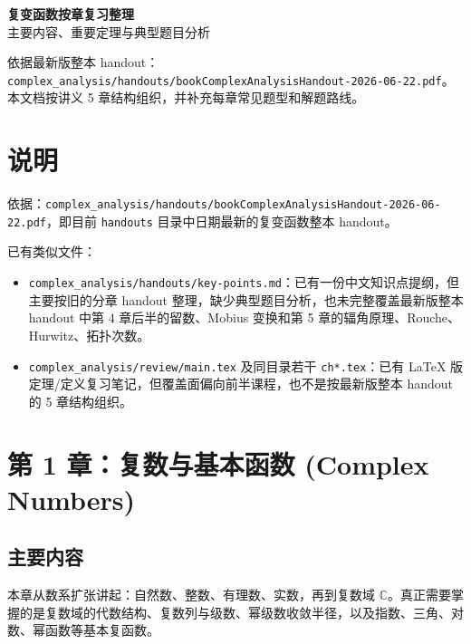 \documentclass{article}
\newcommand{\C}{\mathbb{C}}
\newcommand{\sourceHandout}{\texttt{complex\_analysis/handouts/bookComplexAnalysisHandout-2026-06-22.pdf}}
\newcommand{\keyFile}[1]{\texttt{#1}}
\begin{document}
\pagestyle{fancy}
\fancyhead{}
\rhead{\today}

\begin{center}
  {\Large\bfseries 复变函数按章复习整理}\\[6pt]
  {\large 主要内容、重要定理与典型题目分析}
\end{center}
\vspace{6pt}

\noindent
依据最新版整本 handout：\sourceHandout。
本文档按讲义 5 章结构组织，并补充每章常见题型和解题路线。

\tableofcontents
\newpage

\section*{说明}

依据：\sourceHandout，即目前 \keyFile{handouts} 目录中日期最新的复变函数整本 handout。

已有类似文件：

\begin{itemize}
\item
  \texttt{complex\_analysis/handouts/key-points.md}：已有一份中文知识点提纲，但主要按旧的分章
  handout 整理，缺少典型题目分析，也未完整覆盖最新版整本 handout 中第 4
  章后半的留数、Mobius 变换和第 5
  章的辐角原理、Rouche、Hurwitz、拓扑次数。
\item
  \texttt{complex\_analysis/review/main.tex} 及同目录若干
  \texttt{ch*.tex}：已有 LaTeX
  版定理/定义复习笔记，但覆盖面偏向前半课程，也不是按最新版整本 handout
  的 5 章结构组织。
\end{itemize}

\section{第 1 章：复数与基本函数 (Complex Numbers)}

\subsection{主要内容}

本章从数系扩张讲起：自然数、整数、有理数、实数，再到复数域
$\C$。真正需要掌握的是复数域的代数结构、复数列与级数、幂级数收敛半径，以及指数、三角、对数、幂函数等基本复函数。
\end{document}
